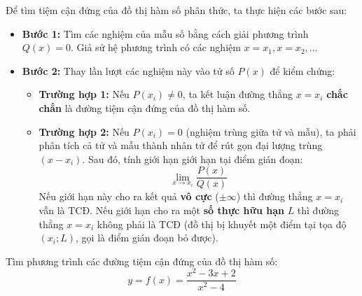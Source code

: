 \documentclass[12pt]{article}
\begin{document}
	\begin{phuongphap}[Quy tắc xác định nhanh cho hàm phân thức $y = \frac{P(x)}{Q(x)}$]
		Để tìm tiệm cận đứng của đồ thị hàm số phân thức, ta thực hiện các bước sau:
		\begin{itemize}
			\item \textbf{Bước 1:} Tìm các nghiệm của mẫu số bằng cách giải phương trình $Q(x) = 0$. Giả sử hệ phương trình có các nghiệm $x = x_1, x = x_2, \dots$
			\item \textbf{Bước 2:} Thay lần lượt các nghiệm này vào tử số $P(x)$ để kiểm chứng:
			\begin{itemize}
				\item \textbf{Trường hợp 1:} Nếu $P(x_i) \ne 0$, ta kết luận đường thẳng $x = x_i$ \textbf{chắc chắn} là đường tiệm cận đứng của đồ thị hàm số.
				\item \textbf{Trường hợp 2:} Nếu $P(x_i) = 0$ (nghiệm trùng giữa tử và mẫu), ta phải phân tích cả tử và mẫu thành nhân tử để rút gọn đại lượng trùng $(x - x_i)$. Sau đó, tính giới hạn giới hạn tại điểm gián đoạn:
				\[ \lim_{x \to x_i} \frac{P(x)}{Q(x)} \]
				Nếu giới hạn này cho ra kết quả \textbf{vô cực} ($\pm\infty$) thì đường thẳng $x = x_i$ vẫn là TCĐ. Nếu giới hạn cho ra một \textbf{số thực hữu hạn} $L$ thì đường thẳng $x = x_i$ không phải là TCĐ (đồ thị bị khuyết một điểm tại tọa độ $(x_i; L)$, gọi là điểm gián đoạn bỏ được).
			\end{itemize}
		\end{itemize}
	\end{phuongphap}
	
	\begin{vidu}[2]
		Tìm phương trình các đường tiệm cận đứng của đồ thị hàm số:
		\[ y = f(x) = \frac{x^2 - 3x + 2}{x^2 - 4} \]
	\end{vidu}
	
\end{document}
